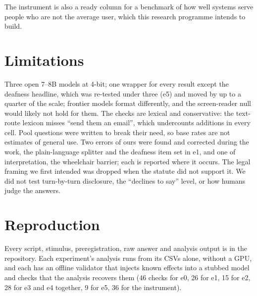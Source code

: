 \documentclass[11pt]{article}
\begin{document}
The instrument is also a ready column for a benchmark of how well systems serve
people who are not the average user, which this research programme intends to
build.

\section{Limitations}
\label{sec:limits}

Three open 7--8B models at 4-bit; one wrapper for every result except the
deafness headline, which was re-tested under three (e5) and moved by up to a
quarter of the scale; frontier models format differently, and the screen-reader null would likely not hold for them. The checks
are lexical and conservative: the text-route lexicon misses ``send them an email'',
which undercounts additions in every cell. Pool questions were written to break
their need, so base rates are not estimates of general use. Two errors of ours
were found and corrected during the work, the plain-language splitter and the
deafness item set in e1, and one of interpretation, the wheelchair barrier; each is
reported where it occurs. The legal framing we first intended was dropped when the
statute did not support it. We did not test turn-by-turn disclosure, the ``declines
to say'' level, or how humans judge the answers.

\section{Reproduction}
\label{sec:repro}

Every script, stimulus, preregistration, raw answer and analysis output is in the
repository. Each experiment's analysis runs from its CSVs alone, without a GPU,
and each has an offline validator that injects known effects into a stubbed model
and checks that the analysis recovers them (46 checks for e0, 26 for e1, 15 for e2,
28 for e3 and e4 together, 9 for e5, 36 for the instrument).
\end{document}
